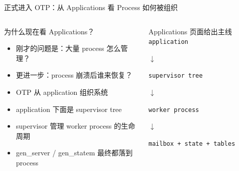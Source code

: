 \documentclass[aspectratio=169, 9pt]{beamer}
\newcommand{\code}[1]{\texttt{#1}}
\begin{document}
\begin{frame}{正式进入 OTP：从 Applications 看 Process 如何被组织}
  \begin{columns}[T,onlytextwidth]
    \begin{block}{为什么现在看 Applications？}
      \begin{itemize}
        \item 刚才的问题是：大量 process 怎么管理？
        \item 更进一步：process 崩溃后谁来恢复？
        \item OTP 从 application 组织系统
        \item application 下面是 supervisor tree
        \item supervisor 管理 worker process 的生命周期
        \item gen\_server / gen\_statem 最终都落到 process
      \end{itemize}
    \end{block}
    \begin{exampleblock}{Applications 页面给出主线}
      \centering
      \code{application}\par
      $\downarrow$\par
      \code{supervisor tree}\par
      $\downarrow$\par
      \code{worker process}\par
      $\downarrow$\par
      \code{mailbox + state + tables}
    \end{exampleblock}
  \end{columns}
\end{frame}
\end{document}
